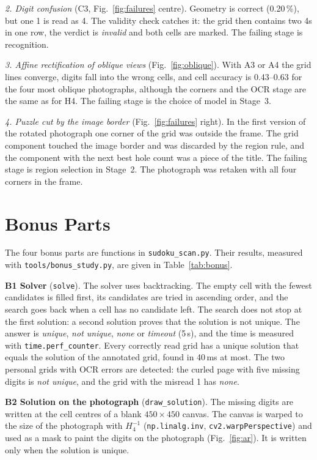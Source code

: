 \documentclass[conference]{IEEEtran}
\begin{document}
\emph{2. Digit confusion} (C3, Fig.~\ref{fig:failures} centre). Geometry is
correct (0.20\,\%), but one 1 is read as 4. The validity check catches it:
the grid then contains two 4s in one row, the verdict is \emph{invalid} and
both cells are marked. The failing stage is recognition.

\emph{3. Affine rectification of oblique views} (Fig.~\ref{fig:oblique}).
With A3 or A4 the grid lines converge, digits fall into the wrong cells, and
cell accuracy is 0.43--0.63 for the four most oblique photographs, although
the corners and the OCR stage are the same as for H4. The failing stage is
the choice of model in Stage~3.

\emph{4. Puzzle cut by the image border} (Fig.~\ref{fig:failures} right).
In the first version of the rotated photograph one corner of the grid was
outside the frame. The grid component touched the image border and was
discarded by the region rule, and the component with the next best hole
count was a piece of the title. The failing stage is region selection in
Stage~2. The photograph was retaken with all four corners in the frame.

\section{Bonus Parts}
\label{sec:bonus}
The four bonus parts are functions in \texttt{sudoku\_scan.py}. Their
results, measured with \texttt{tools/bonus\_study.py}, are given in
Table~\ref{tab:bonus}.

\textbf{B1 Solver} (\texttt{solve}). The solver uses backtracking. The empty
cell with the fewest candidates is filled first, its candidates are tried in
ascending order, and the search goes back when a cell has no candidate left.
The search does not stop at the first solution: a second solution proves
that the solution is not unique. The answer is \emph{unique},
\emph{not unique}, \emph{none} or \emph{timeout} (5\,s), and the time is
measured with \texttt{time.perf\_counter}. Every correctly read grid has a
unique solution that equals the solution of the annotated grid, found in
40\,ms at most. The two personal grids with OCR errors are detected: the
curled page with five missing digits is \emph{not unique}, and the grid with
the misread 1 has \emph{none}.

\textbf{B2 Solution on the photograph} (\texttt{draw\_solution}). The
missing digits are written at the cell centres of a blank $450\times450$
canvas. The canvas is warped to the size of the photograph with
$H_4^{-1}$ (\texttt{np.linalg.inv}, \texttt{cv2.warpPerspective}) and used
as a mask to paint the digits on the photograph
(Fig.~\ref{fig:ar}). It is written only when the solution is unique.
\end{document}
